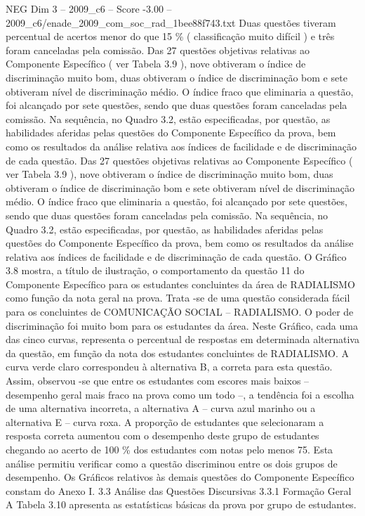 \begin{textsample}{NEG Dim 3 – 2009\_c6 – Score -3.00 – 2009\_c6/enade\_2009\_com\_soc\_rad\_1bee88f743.txt}
Duas questões tiveram percentual de acertos menor do que 15 \% ( classificação muito difícil ) e três foram canceladas pela comissão.
Das 27 questões objetivas relativas ao Componente Específico ( ver Tabela 3.9 ), nove obtiveram o índice de discriminação muito bom, duas obtiveram o índice de discriminação bom e sete obtiveram nível de discriminação médio.
O índice fraco que eliminaria a questão, foi alcançado por sete questões, sendo que duas questões foram canceladas pela comissão.
Na sequência, no Quadro 3.2, estão especificadas, por questão, as habilidades aferidas pelas questões do Componente Específico da prova, bem como os resultados da análise relativa aos índices de facilidade e de discriminação de cada questão.
Das 27 questões objetivas relativas ao Componente Específico ( ver Tabela 3.9 ), nove obtiveram o índice de discriminação muito bom, duas obtiveram o índice de discriminação bom e sete obtiveram nível de discriminação médio.
O índice fraco que eliminaria a questão, foi alcançado por sete questões, sendo que duas questões foram canceladas pela comissão.
Na sequência, no Quadro 3.2, estão especificadas, por questão, as habilidades aferidas pelas questões do Componente Específico da prova, bem como os resultados da análise relativa aos índices de facilidade e de discriminação de cada questão.
O Gráfico 3.8 mostra, a título de ilustração, o comportamento da questão 11 do Componente Específico para os estudantes concluintes da área de RADIALISMO como função da nota geral na prova.
Trata -se de uma questão considerada fácil para os concluintes de COMUNICAÇÃO SOCIAL – RADIALISMO.
O poder de discriminação foi muito bom para os estudantes da área.
Neste Gráfico, cada uma das cinco curvas, representa o percentual de respostas em determinada alternativa da questão, em função da nota dos estudantes concluintes de RADIALISMO.
A curva verde claro correspondeu à alternativa B, a correta para esta questão.
Assim, observou -se que entre os estudantes com escores mais baixos – desempenho geral mais fraco na prova como um todo –, a tendência foi a escolha de uma alternativa incorreta, a alternativa A – curva azul marinho ou a alternativa E – curva roxa.
A proporção de estudantes que selecionaram a resposta correta aumentou com o desempenho deste grupo de estudantes chegando ao acerto de 100 \% dos estudantes com notas pelo menos 75.
Esta análise permitiu verificar como a questão discriminou entre os dois grupos de desempenho.
Os Gráficos relativos às demais questões do Componente Específico constam do Anexo I. 3.3 Análise das Questões Discursivas 3.3.1 Formação Geral A Tabela 3.10 apresenta as estatísticas básicas da prova por grupo de estudantes.

\end{textsample}
